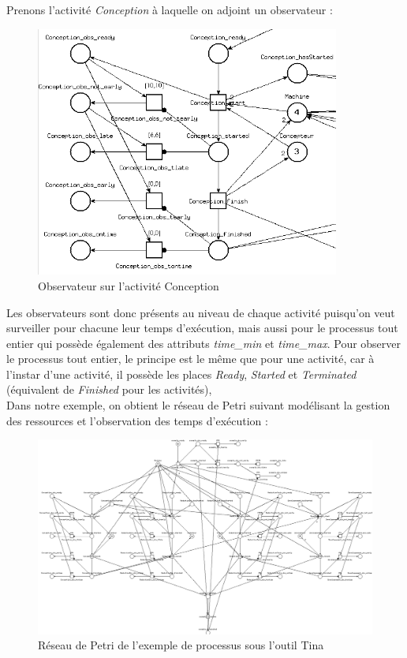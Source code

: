 \documentclass{report}
\begin{document}
Prenons l'activité \textit{Conception} à laquelle on adjoint un observateur :

\begin{figure}[!h] 
\begin{center}
\includegraphics[width=10cm]{Capture-18.png}
\caption{Observateur sur l'activité Conception} 
\label{img1} 
\end{center}
\end{figure} 

Les observateurs sont donc présents au niveau de chaque activité puisqu'on veut surveiller pour chacune leur temps d'exécution, mais aussi pour le processus tout entier qui possède également des attributs \textit{time\_min} et \textit{time\_max}. Pour observer le processus tout entier, le principe est le même que pour une activité, car à l'instar d'une activité, il possède les places \textit{Ready}, \textit{Started} et \textit{Terminated} (équivalent de \textit{Finished} pour les activités), \\

Dans notre exemple, on obtient le réseau de Petri suivant modélisant la gestion des ressources et l'observation des temps d'exécution :

\begin{figure}[!h] 
\begin{center}
\includegraphics[width=18cm]{Capture-17.png}
\caption{Réseau de Petri de l'exemple de processus sous l'outil Tina} 
\label{img1} 
\end{center}
\end{figure} 
\end{document}
